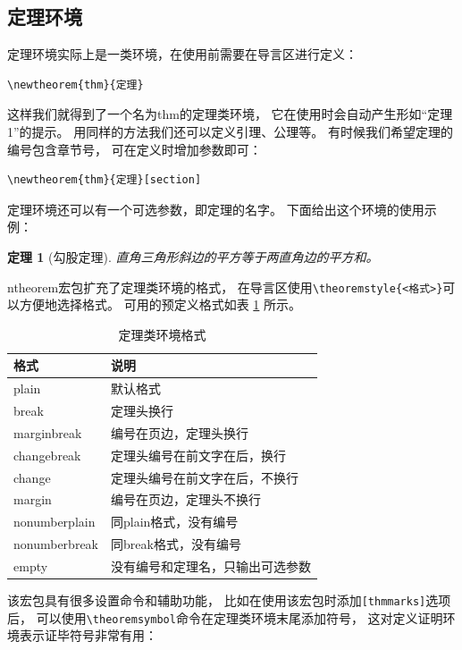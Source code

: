 \documentclass{ctexart}
\numberwithin{equation}{section}			%
\newtheorem{thm}{定理}[section]
{	%
	\theoremstyle{nonumberplain}
	\theoremheaderfont{\bfseries}
	\theorembodyfont{\normalfont}
	\theoremsymbol{\ensuremath{\Box}}
	\newtheorem{proof}{证明}
}
\begin{document}
	\subsection{定理环境}
	定理环境实际上是一类环境，在使用前需要在导言区进行定义：

\begin{lstlisting}
\newtheorem{thm}{定理}
\end{lstlisting}
	
	这样我们就得到了一个名为thm的定理类环境，
	它在使用时会自动产生形如“定理1”的提示。
	用同样的方法我们还可以定义引理、公理等。
	有时候我们希望定理的编号包含章节号，
	可在定义时增加参数即可：

\begin{lstlisting}
\newtheorem{thm}{定理}[section]
\end{lstlisting}
	
	定理环境还可以有一个可选参数，即定理的名字。
	下面给出这个环境的使用示例：
	
	\begin{thm}[勾股定理]
		直角三角形斜边的平方等于两直角边的平方和。
	\end{thm}	

	ntheorem宏包扩充了定理类环境的格式，
	在导言区使用\verb|\theoremstyle{<格式>}|可以方便地选择格式。
	可用的预定义格式如表 \ref{tab:thmstyle} 所示。
	
	\begin{table}
		\centering
		\caption{定理类环境格式}
		\label{tab:thmstyle}
		\begin{tabular}{ll}
			\toprule
			格式 & 说明 \\
			\midrule
			plain & 默认格式 \\
			break & 定理头换行 \\
			marginbreak & 编号在页边，定理头换行 \\
			changebreak & 定理头编号在前文字在后，换行 \\
			change & 定理头编号在前文字在后，不换行 \\
			margin & 编号在页边，定理头不换行 \\
			nonumberplain & 同plain格式，没有编号 \\
			nonumberbreak & 同break格式，没有编号 \\
			empty & 没有编号和定理名，只输出可选参数 \\
			\bottomrule
		\end{tabular}
	\end{table}
	
	该宏包具有很多设置命令和辅助功能，
	比如在使用该宏包时添加\verb|[thmmarks]|选项后，
	可以使用\verb|\theoremsymbol|命令在定理类环境末尾添加符号，
	这对定义证明环境表示证毕符号非常有用：
	
\end{document}
